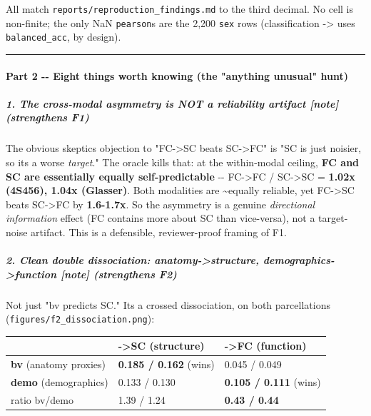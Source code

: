 All match \texttt{reports/reproduction\_findings.md} to the third decimal. No cell is non-finite; the only NaN \texttt{pearson}s are the 2,200 \texttt{sex} rows (classification -\textgreater{} uses \texttt{balanced\_acc}, by design).

\begin{center}\rule{0.5\linewidth}{0.5pt}\end{center}

\paragraph{Part 2 -\/- Eight things worth knowing (the "anything unusual" hunt)}\label{part-2----eight-things-worth-knowing-the-anything-unusual-hunt}

\subparagraph{1. The cross-modal asymmetry is NOT a reliability artifact {[}note{]} (strengthens F1)}\label{1-the-cross-modal-asymmetry-is-not-a-reliability-artifact-note-strengthens-f1}

The obvious skeptic\textquotesingle s objection to "FC-\textgreater SC beats SC-\textgreater FC" is "SC is just noisier, so it\textquotesingle s a worse \emph{target}." The oracle kills that: at the within-modal ceiling, \textbf{FC and SC are essentially equally self-predictable} -\/- FC-\textgreater FC / SC-\textgreater SC = \textbf{1.02x (4S456), 1.04x (Glasser)}. Both modalities are \textasciitilde equally reliable, yet FC-\textgreater SC beats SC-\textgreater FC by \textbf{1.6-1.7x}. So the asymmetry is a genuine \emph{directional information} effect (FC contains more about SC than vice-versa), not a target-noise artifact. This is a defensible, reviewer-proof framing of F1.

\subparagraph{2. Clean double dissociation: anatomy-\textgreater structure, demographics-\textgreater function {[}note{]} (strengthens F2)}\label{2-clean-double-dissociation-anatomy-structure-demographics-function-note-strengthens-f2}

Not just "bv predicts SC." It\textquotesingle s a crossed dissociation, on both parcellations (\texttt{figures/f2\_dissociation.png}):

{\def\LTcaptype{none} %
\begin{longtable}[]{@{}lll@{}}
\toprule\noalign{}
& -\textgreater SC (structure) & -\textgreater FC (function) \\
\midrule\noalign{}
\endhead
\bottomrule\noalign{}
\endlastfoot
\textbf{bv} (anatomy proxies) & \textbf{0.185 / 0.162} (wins) & 0.045 / 0.049 \\
\textbf{demo} (demographics) & 0.133 / 0.130 & \textbf{0.105 / 0.111} (wins) \\
ratio bv/demo & 1.39 / 1.24 & \textbf{0.43 / 0.44} \\
\end{longtable}
}

